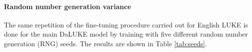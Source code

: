 \documentclass[main.tex]{subfiles}
\begin{document}
\paragraph{Random number generation variance}
The same repetition of the fine-tuning procedure carried out for English LUKE is done for the main DaLUKE model by training with five different random number generation (RNG) seeds.
The results are shown in Table \ref{tab:seeds}.











\end{document}

